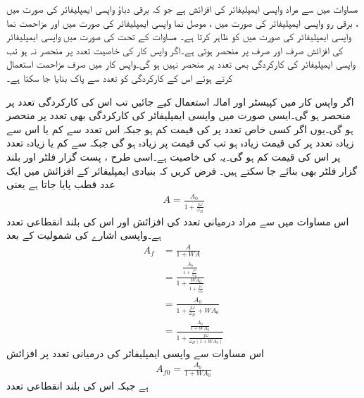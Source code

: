 مساوات  میں  سے مراد واپسی ایمپلیفائر کی افزائش ہے جو کہ برقی دباؤ واپسی ایمپلیفائر کی صورت میں
 ، برقی رو واپسی ایمپلیفائر کی صورت میں ، موصل نما واپسی ایمپلیفائر کی صورت میں  اور مزاحمت نما واپسی ایمپلیفائر کی صورت میں  کو ظاہر کرتا ہے۔
مساوات  کے تحت  کی صورت میں واپسی ایمپلیفائر کی افزائش صرف اور صرف  پر منحصر ہوتی ہے۔اگر واپس کار کی خاصیت تعدد پر منحصر نہ ہو تب واپسی ایمپلیفائر کی کارکردگی بھی تعدد پر منحصر نہیں ہو گی۔واپس کار میں صرف مزاحمت استعمال کرتے ہوئے اس کے کارکردگی کو تعدد سے پاک بنایا جا سکتا ہے۔

اگر واپس کار میں کپیسٹر اور امالہ استعمال کیے جائیں تب اس کی کارکردگی تعدد پر منحصر ہو گی۔ایسی صورت میں واپسی ایمپلیفائر کی کارکردگی بھی تعدد پر منحصر ہو گی۔یوں اگر کسی خاص تعدد  پر  کی قیمت کم ہو جبکہ اس تعدد سے کم یا اس سے زیادہ تعدد پر   کی قیمت زیادہ ہو تب  کی قیمت  پر زیادہ ہو گی جبکہ  سے کم یا زیادہ تعدد پر اس کی قیمت کم ہو گی۔یہ  کی خاصیت ہے۔اسی طرح ، پست گزار فلٹر اور بلند گزار فلٹر بھی بنائے جا سکتے ہیں۔
فرض کریں کہ بنیادی ایمپلیفائر کے افزائش میں ایک عدد قطب پایا جاتا ہے یعنی
\begin{align*}
A=\frac{A_0}{1+\frac{j \omega }{\omega_H}}
\end{align*}
اس مساوات میں  سے مراد درمیانی تعدد کی افزائش اور  اس کی بلند انقطاعی تعدد ہے۔واپسی اشارے کی شمولیت کے بعد
\begin{align*}
A_f&=\frac{A}{1+W A}\\
&=\frac{\frac{A_0}{1+\frac{j \omega }{\omega_H}}}{1+\frac{W A_0}{1+\frac{j \omega }{\omega_H}}}\\
&=\frac{A_0}{1+\frac{j \omega}{\omega_H}+W A_0}\\
&= \frac{\frac{A_0}{1+W A_0}}{1+\frac{j \omega}{\omega_H \left(1+W A_0 \right)}}
\end{align*}
اس مساوات سے واپسی ایمپلیفائر کی درمیانی تعدد پر افزائش
\begin{align}
A_{f0}=\frac{A_0}{1+W A_0}
\end{align}
ہے جبکہ اس کی بلند انقطاعی تعدد

